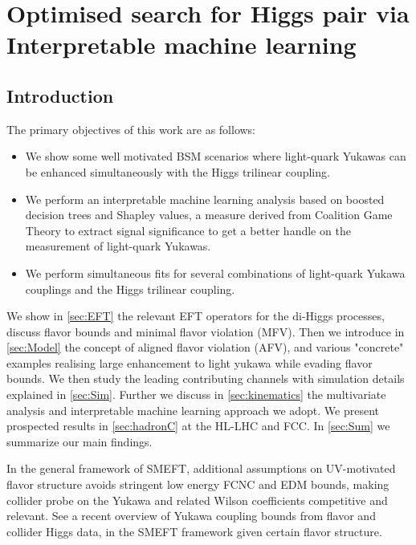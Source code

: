 
\chapter{ Optimised search for Higgs pair via Interpretable machine learning }\label{chap:MLLightYuk}
\section{Introduction}
\label{sec:Intro}


The primary objectives of this work are as follows:


\begin{itemize}
	\item We show some well motivated BSM scenarios where light-quark Yukawas can be enhanced simultaneously with the Higgs trilinear coupling.
	\item We perform an interpretable machine learning analysis based on boosted decision trees and Shapley values, a measure derived from Coalition Game Theory to extract signal significance to get a better handle on the measurement of light-quark Yukawas.
	\item We perform simultaneous fits for several combinations of light-quark Yukawa couplings and the Higgs trilinear coupling.
\end{itemize}

We show in \autoref{sec:EFT} the relevant EFT operators for the di-Higgs processes, discuss flavor bounds and minimal flavor violation (MFV). Then we introduce in \autoref{sec:Model} the concept of aligned flavor violation (AFV), and various "concrete" examples realising large enhancement to light yukawa while evading flavor bounds. We then study the leading contributing channels with simulation details explained in \autoref{sec:Sim}. Further we discuss in \autoref{sec:kinematics} the multivariate analysis and interpretable machine learning approach we adopt. We present prospected results in \autoref{sec:hadronC} at the HL-LHC and FCC. In \autoref{sec:Sum} we summarize our main findings.



In the general framework of SMEFT, additional assumptions on UV-motivated flavor structure avoids stringent low energy FCNC and EDM bounds, making collider probe on the Yukawa and related Wilson coefficients competitive and relevant. See a recent overview of Yukawa coupling bounds from flavor and collider Higgs data, in the SMEFT framework given certain flavor structure. \cite{Alonso-Gonzalez:2021tpo}

